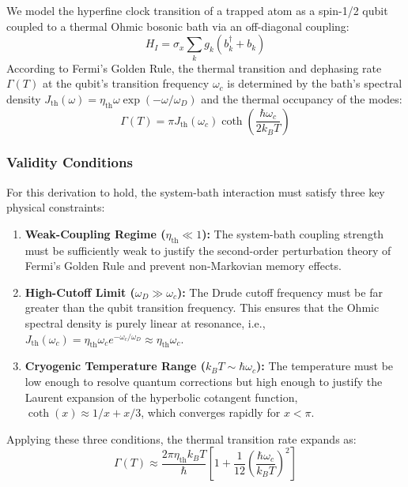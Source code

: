 \documentclass[reprint,amsmath,amssymb,aps,pra,superscriptaddress]{revtex4-2}
\begin{document}
We model the hyperfine clock transition of a trapped atom as a spin-1/2 qubit coupled to a thermal Ohmic bosonic bath via an off-diagonal coupling:
\begin{equation}
    H_I = \sigma_x \sum_k g_k (b_k^\dagger + b_k)
\end{equation}
According to Fermi's Golden Rule, the thermal transition and dephasing rate $\Gamma(T)$ at the qubit's transition frequency $\omega_c$ is determined by the bath's spectral density $J_{\text{th}}(\omega) = \eta_{\text{th}} \omega \exp(-\omega/\omega_D)$ and the thermal occupancy of the modes:
\begin{equation}
    \Gamma(T) = \pi J_{\text{th}}(\omega_c) \coth\left( \frac{\hbar \omega_c}{2 k_B T} \right)
\end{equation}

\subsubsection{Validity Conditions}
For this derivation to hold, the system-bath interaction must satisfy three key physical constraints:
\begin{enumerate}
    \item \textbf{Weak-Coupling Regime ($\eta_{\text{th}} \ll 1$):} The system-bath coupling strength must be sufficiently weak to justify the second-order perturbation theory of Fermi's Golden Rule and prevent non-Markovian memory effects.
    \item \textbf{High-Cutoff Limit ($\omega_D \gg \omega_c$):} The Drude cutoff frequency must be far greater than the qubit transition frequency. This ensures that the Ohmic spectral density is purely linear at resonance, i.e., $J_{\text{th}}(\omega_c) = \eta_{\text{th}} \omega_c e^{-\omega_c/\omega_D} \approx \eta_{\text{th}} \omega_c$.
    \item \textbf{Cryogenic Temperature Range ($k_B T \sim \hbar \omega_c$):} The temperature must be low enough to resolve quantum corrections but high enough to justify the Laurent expansion of the hyperbolic cotangent function, $\coth(x) \approx 1/x + x/3$, which converges rapidly for $x < \pi$.
\end{enumerate}

Applying these three conditions, the thermal transition rate expands as:
\begin{equation}
    \Gamma(T) \approx \frac{2 \pi \eta_{\text{th}} k_B T}{\hbar} \left[ 1 + \frac{1}{12} \left( \frac{\hbar \omega_c}{k_B T} \right)^2 \right]
\end{equation}
\end{document}
